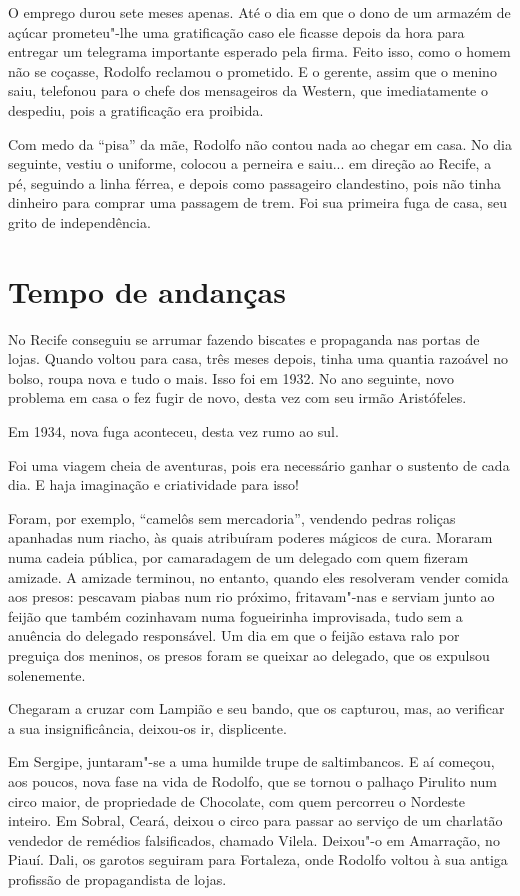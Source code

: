  O emprego durou sete meses apenas. Até o dia em que o dono de um
armazém de açúcar prometeu"-lhe uma gratificação caso ele ficasse
depois da hora para entregar um telegrama importante esperado pela
firma. Feito isso, como o homem não se coçasse, Rodolfo reclamou o
prometido. E o gerente, assim que o menino saiu, telefonou para o chefe
dos mensageiros da Western, que imediatamente o despediu, pois a
gratificação era proibida. 

 Com medo da ``pisa'' da mãe, Rodolfo não
contou nada ao chegar em casa. No dia seguinte, vestiu o uniforme,
colocou a perneira e saiu... em direção ao Recife, a pé, seguindo a
linha férrea, e depois como passageiro clandestino, pois não tinha
dinheiro para comprar uma passagem de trem. Foi sua primeira fuga de
casa, seu grito de independência. 

\section{Tempo de andanças}


 No Recife conseguiu se arrumar fazendo biscates e propaganda nas portas
de lojas. Quando voltou para casa, três meses depois, tinha uma quantia
razoável no bolso, roupa nova e tudo o mais. Isso foi em 1932. No ano
seguinte, novo problema em casa o fez fugir de novo, desta vez com seu
irmão Aristófeles. 

 Em 1934, nova fuga aconteceu, desta vez rumo ao sul. 

 Foi uma viagem cheia de aventuras, pois era necessário ganhar o
sustento de cada dia. E haja imaginação e criatividade para isso! 

 Foram, por exemplo, ``camelôs sem
mercadoria'', vendendo pedras roliças apanhadas num
riacho, às quais atribuíram poderes mágicos de cura. Moraram numa
cadeia pública, por camaradagem de um delegado com quem fizeram
amizade. A amizade terminou, no entanto, quando eles resolveram vender
comida aos presos: pescavam piabas num rio próximo, fritavam"-nas e
serviam junto ao feijão que também cozinhavam numa fogueirinha
improvisada, tudo sem a anuência do delegado responsável. Um dia em que
o feijão estava ralo por preguiça dos meninos, os presos foram se
queixar ao delegado, que os expulsou solenemente. 

 Chegaram a cruzar com Lampião e seu bando, que os capturou, mas, ao
verificar a sua insignificância, deixou-os ir, displicente. 

 Em Sergipe, juntaram"-se a uma humilde trupe de saltimbancos. E aí
começou, aos poucos, nova fase na vida de Rodolfo, que se tornou o
palhaço Pirulito num circo maior, de propriedade de Chocolate, com quem
percorreu o Nordeste inteiro. Em Sobral, Ceará, deixou o circo para
passar ao serviço de um charlatão vendedor de remédios falsificados,
chamado Vilela. Deixou"-o em Amarração, no Piauí. Dali, os garotos
seguiram para Fortaleza, onde Rodolfo voltou à sua antiga profissão de
propagandista de lojas. 

